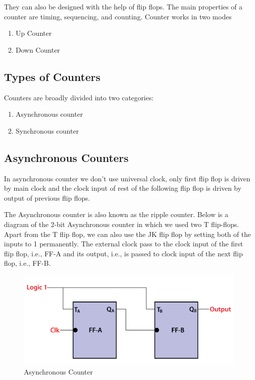 \documentclass[11pt]{article}
\begin{document}
They can also  be designed with the help of flip flops. The main properties of a counter are timing, sequencing, and counting. Counter  works in two modes
\begin{enumerate}
	\item Up Counter
	\item Down Counter
\end{enumerate}
\subsection{Types of Counters}
Counters are broadly divided into two categories:
\begin{enumerate}
	\item Asynchronous counter
	\item Synchronous counter
\end{enumerate}


\subsection{Asynchronous Counters}
In asynchronous counter we don't use universal clock, only first flip flop is driven by main clock and the clock input of rest of the following flip flop is driven by output of previous flip flops.

The Asynchronous counter is also known as the ripple counter. Below is a diagram of the 2-bit Asynchronous counter in which we used two T flip-flops. Apart from the T flip flop, we can also use the JK flip flop by setting both of the inputs to 1 permanently. The external clock pass to the clock input of the first flip flop, i.e., FF-A and its output, i.e., is passed to clock input of the next flip flop, i.e., FF-B.

\begin{figure}[H]
	\centering
	\includegraphics[scale=0.5]{counters2.png}
	\caption{Asynchronous Counter}
\end{figure}
\end{document}
